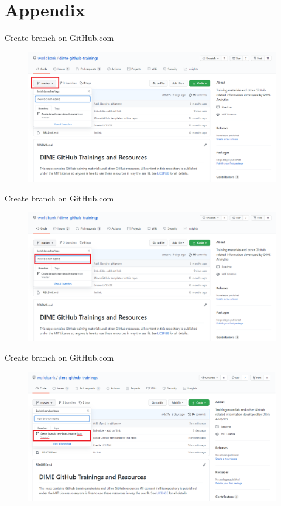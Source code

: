 \documentclass[aspectratio=169]{beamer} %
\begin{document}




\section{Appendix}

\begin{frame}{Create branch on GitHub.com}
\label{new-branch}

\begin{figure}
	\centering
	\includegraphics[width=.9\textwidth]{./img/new-branch-1.png}
\end{figure}
\end{frame}

\begin{frame}{Create branch on GitHub.com}
\begin{figure}
	\centering
	\includegraphics[width=.9\textwidth]{./img/new-branch-2.png}
\end{figure}
\end{frame}

\begin{frame}{Create branch on GitHub.com}
\begin{figure}
	\centering
	\includegraphics[width=.9\textwidth]{./img/new-branch-3.png}
\end{figure}
\hyperlink{Create a branch}{}
\end{frame}
\end{document}
